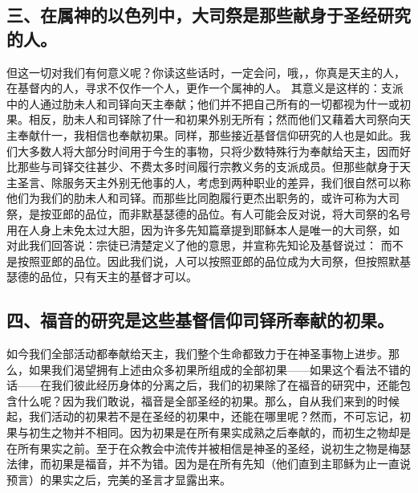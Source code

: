 
\subsection{三、在属神的以色列中，大司祭是那些献身于圣经研究的人。}

但这一切对我们有何意义呢？你读这些话时，一定会问，哦，，你真是天主的人，在基督内的人，寻求不仅作一个人，更作一个属神的人。 其意义是这样的：支派中的人通过肋未人和司铎向天主奉献；他们并不把自己所有的一切都视为什一或初果。相反，肋未人和司铎除了什一和初果外别无所有；然而他们又藉着大司祭向天主奉献什一，我相信也奉献初果。同样，那些接近基督信仰研究的人也是如此。我们大多数人将大部分时间用于今生的事物，只将少数特殊行为奉献给天主，因而好比那些与司铎交往甚少、不费太多时间履行宗教义务的支派成员。但那些献身于天主圣言、除服务天主外别无他事的人，考虑到两种职业的差异，我们很自然可以称他们为我们的肋未人和司铎。而那些比同胞履行更杰出职务的，或许可称为大司祭，是按亚郎的品位，而非默基瑟德的品位。有人可能会反对说，将大司祭的名号用在人身上未免太过大胆，因为许多先知篇章提到耶稣本人是唯一的大司祭，如 对此我们回答说：宗徒已清楚定义了他的意思，并宣称先知论及基督说过： 而不是按照亚郎的品位。因此我们说，人可以按照亚郎的品位成为大司祭，但按照默基瑟德的品位，只有天主的基督才可以。\par


\subsection{四、福音的研究是这些基督信仰司铎所奉献的初果。}

如今我们全部活动都奉献给天主，我们整个生命都致力于在神圣事物上进步。那么，如果我们渴望拥有上述由众多初果所组成的全部初果——如果这个看法不错的话——在我们彼此经历身体的分离之后，我们的初果除了在福音的研究中，还能包含什么呢？因为我们敢说，福音是全部圣经的初果。那么，自从我们来到的时候起，我们活动的初果若不是在圣经的初果中，还能在哪里呢？然而，不可忘记，初果与初生之物并不相同。因为初果是在所有果实成熟之后奉献的，而初生之物却是在所有果实之前。至于在众教会中流传并被相信是神圣的圣经，说初生之物是梅瑟法律，而初果是福音，并不为错。因为是在所有先知（他们直到主耶稣为止一直说预言）的果实之后，完美的圣言才显露出来。\par

